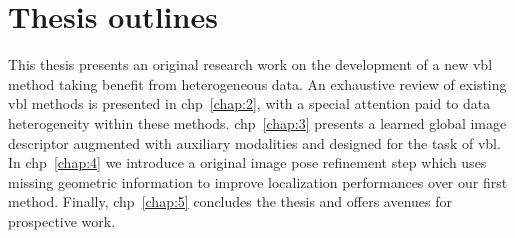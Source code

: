 \section{Thesis outlines}
This thesis presents an original research work on the development of a new \ac{vbl} method taking benefit from heterogeneous data. An exhaustive review of existing \ac{vbl} methods is presented in \acl{chp}~\ref{chap:2}, with a special attention paid to data heterogeneity within these methods. \Ac{chp}~\ref{chap:3} presents a learned global image descriptor augmented with auxiliary modalities and designed for the task of \ac{vbl}. In \ac{chp}~\ref{chap:4} we introduce a original image pose refinement step which uses missing geometric information to improve localization performances over our first method. Finally, \ac{chp}~\ref{chap:5} concludes the thesis and offers avenues for prospective work.